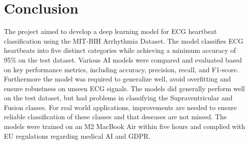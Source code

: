 \section{Conclusion}
The project aimed to develop a deep learning model for ECG heartbeat classification using the MIT-BIH Arrhythmia Dataset. The model classifies ECG heartbeats into five distinct categories while achieving a minimum accuracy of 95\% on the test dataset. Various AI models were compared and evaluated based on key performance metrics, including accuracy, precision, recall, and F1-score. Furthermore the model was required to generalize well, avoid overfitting and ensure robustness on unseen ECG signals. The models did generally perform well on the test dataset, but had problems in classifying the Supraventricular and Fusion classes. For real world applications, improvements are needed to ensure reliable classification of these classes and that deseases are not missed.
The models were trained on an M2 MacBook Air within five hours and complied with EU regulations regarding medical AI and GDPR.